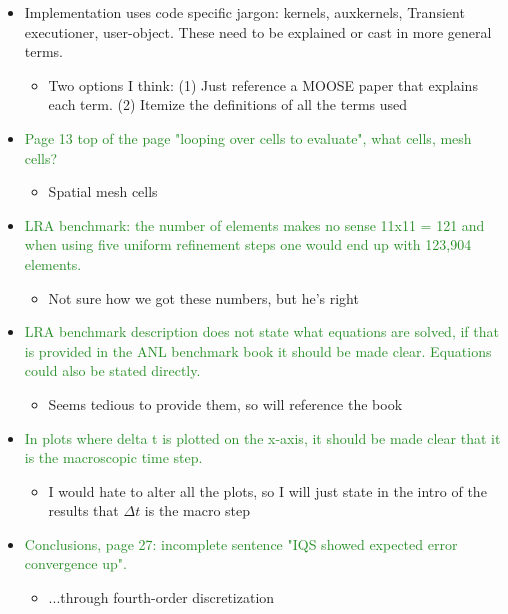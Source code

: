 \documentclass{elsarticle}
\newcommand{\fix}{\textsquare}
\newcommand{\easy}[1]{\textcolor{ForestGreen}{#1}}
\newcommand{\medm}[1]{\textcolor{BurntOrange}{#1}}
\begin{document}
\begin{itemize}
\item[\fix] \medm{ Implementation uses code specific jargon: kernels, auxkernels, Transient executioner, user-object. These need to be explained or cast in more general terms. }
\begin{itemize}
\item Two options I think: (1) Just reference a MOOSE paper that explains each term. (2) Itemize the definitions of all the terms used
\end{itemize}

\item[\fix] \easy{ Page 13 top of the page "looping over cells to evaluate", what cells, mesh cells? }
\begin{itemize}
\item Spatial mesh cells
\end{itemize}

\item[\fix] \easy{ LRA benchmark: the number of elements makes no sense 11x11 = 121 and when using five uniform refinement steps one would end up with 123,904 elements. }
\begin{itemize}
\item  Not sure how we got these numbers, but he's right
\end{itemize}

\item[\fix] \easy{ LRA benchmark description does not state what equations are solved, if that is provided in the ANL benchmark book it should be made clear. Equations could also be stated directly. }
\begin{itemize}
\item  Seems tedious to provide them, so will reference the book
\end{itemize}

\item[\fix] \easy{ In plots where delta t is plotted on the x-axis, it should be made clear that it is the macroscopic time step. }
\begin{itemize}
\item I would hate to alter all the plots, so I will just state in the intro of the results that $\Delta t$ is the macro step
\end{itemize}

\item[\fix] \easy{ Conclusions, page 27: incomplete sentence "IQS showed expected error convergence up". }
\begin{itemize}
\item ...through fourth-order discretization 
\end{itemize}


\end{itemize}
\end{document}
